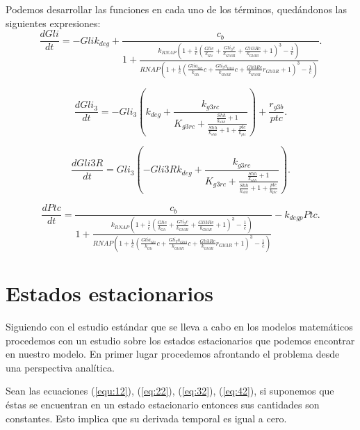 Podemos desarrollar las funciones en cada uno de los términos, quedándonos las siguientes expresiones:
\begin{equation}
\frac{dGli}{dt}=- Gli k_{deg} + \frac{c_{b}}{1 + \frac{k_{RNAP} \left(1 + \frac{1}{c} \left(\frac{Gli c}{k_{Gli}} + \frac{Gli_{3} c}{k_{Gli3R}} + \frac{Gli3R c}{k_{Gli3R}} + 1\right)^{3} - \frac{1}{c}\right)}{RNAP \left(1 + \frac{1}{c} \left(\frac{Gli a_{Gli}}{k_{Gli}} c + \frac{Gli_{3} a_{Gli3}}{k_{Gli3R}} c + \frac{Gli3R c}{k_{Gli3R}} r_{Gli3R} + 1\right)^{3} - \frac{1}{c}\right)}}.
\end{equation}


\begin{equation}
\frac{dGli_3}{dt}=- Gli_{3} \left(k_{deg} + \frac{k_{g3rc}}{K_{g3rc} + \frac{\frac{Shh}{k_{shh}} + 1}{\frac{Shh}{k_{shh}} + 1 + \frac{ptc}{k_{ptc}}}}\right) + \frac{r_{g3b}}{ptc}.
\end{equation}

\begin{equation}
\frac{dGli3R}{dt}=Gli_{3} \left(- Gli3R k_{deg} + \frac{k_{g3rc}}{K_{g3rc} + \frac{\frac{Shh}{k_{shh}} + 1}{\frac{Shh}{k_{shh}} + 1 + \frac{ptc}{k_{ptc}}}}\right).
\end{equation}

\begin{equation}
\frac{dPtc}{dt}=\frac{c_{b}}{1 + \frac{k_{RNAP} \left(1 + \frac{1}{c} \left(\frac{Gli c}{k_{Gli}} + \frac{Gli_{3} c}{k_{Gli3R}} + \frac{Gli3R c}{k_{Gli3R}} + 1\right)^{3} - \frac{1}{c}\right)}{RNAP \left(1 + \frac{1}{c} \left(\frac{Gli a_{Gli}}{k_{Gli}} c + \frac{Gli_{3} a_{Gli3}}{k_{Gli3R}} c + \frac{Gli3R c}{k_{Gli3R}} r_{Gli3R} + 1\right)^{3} - \frac{1}{c}\right)}} - k_{deg p} Ptc.
\end{equation}




\section{Estados estacionarios}\label{apartado3.4}
Siguiendo con el estudio estándar que se lleva a cabo en los modelos matemáticos procedemos con un estudio sobre los estados estacionarios que podemos encontrar en nuestro modelo. En primer lugar procedemos afrontando el problema desde una perspectiva analítica. 

Sean las ecuaciones (\ref{equ:12}), (\ref{eq:22}), (\ref{eq:32}), (\ref{eq:42}), si suponemos que éstas se encuentran en un estado estacionario entonces sus cantidades son constantes. Esto implica que su derivada temporal es igual a cero.

